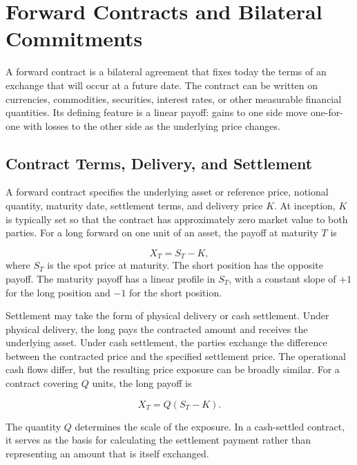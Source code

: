 \section{Forward Contracts and Bilateral Commitments}

A forward contract is a bilateral agreement that fixes today the terms of an exchange that will occur at a future date. The contract can be written on currencies, commodities, securities, interest rates, or other measurable financial quantities. Its defining feature is a linear payoff: gains to one side move one-for-one with losses to the other side as the underlying price changes.


\subsection{Contract Terms, Delivery, and Settlement}

A forward contract specifies the underlying asset or reference price, notional quantity, maturity date, settlement terms, and delivery price $K$. At inception, $K$ is typically set so that the contract has approximately zero market value to both parties. For a long forward on one unit of an asset, the payoff at maturity $T$ is

\begin{equation}
X_T=S_T-K,
\label{eq:ch17-forward-payoff}
\end{equation}
where $S_T$ is the spot price at maturity. The short position has the opposite payoff. The maturity payoff has a linear profile in \(S_T\), with a constant slope of \(+1\) for the long position and \(-1\) for the short position.

Settlement may take the form of physical delivery or cash settlement. Under physical delivery, the long pays the contracted amount and receives the underlying asset. Under cash settlement, the parties exchange the difference between the contracted price and the specified settlement price. The operational cash flows differ, but the resulting price exposure can be broadly similar. For a contract covering $Q$ units, the long payoff is

\begin{equation}
X_T=Q(S_T-K).
\label{eq:ch17-forward-payoff-quantity}
\end{equation}

The quantity $Q$ determines the scale of the exposure. In a cash-settled contract, it serves as the basis for calculating the settlement payment rather than representing an amount that is itself exchanged.

